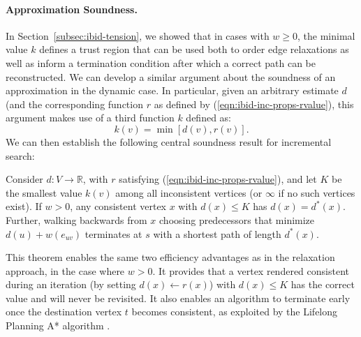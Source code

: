 \paragraph{Approximation Soundness.}
In Section~\ref{subsec:ibid-tension},
we showed that in cases with $w \geq 0$,
the minimal value $k$ defines a trust region that can be used both
to order edge relaxations as well as inform a termination condition
after which a correct path can be reconstructed.
We can develop a similar argument about the soundness of an
approximation in the dynamic case.
In particular,
given an arbitrary estimate $d$
(and the corresponding function $r$ as defined by
(\ref{eqn:ibid-inc-props-rvalue}),
this argument makes use of a third function $k$ defined as:
\begin{equation}
   k(v) = \min\left[ d(v), r(v) \right].
\end{equation}
We can then establish the following central soundness result
for incremental search:

\begin{theorem}
Consider $d: V \rightarrow \mathbb{R}$,
with $r$ satisfying (\ref{eqn:ibid-inc-props-rvalue}),
and let $K$ be the smallest value $k(v)$
among all inconsistent vertices
(or $\infty$ if no such vertices exist).
If $w > 0$,
any consistent vertex $x$ with $d(x) \leq K$
has $d(x) = d^*(x)$.
Further,
walking backwards from $x$ choosing predecessors that minimize
$d(u) + w(e_{uv})$ terminates at $s$ with a shortest path
of length $d^*(x)$.
\label{thm:ibid-dynamicswsffp-sound}
\end{theorem}

This theorem enables the same two efficiency advantages as in
the relaxation approach, in the case where $w > 0$.
It provides that a vertex rendered consistent during an iteration
(by setting $d(x) \leftarrow r(x)$) with $d(x) \leq K$
has the correct value and will never be revisited.
It also enables an algorithm to terminate early
once the destination vertex $t$ becomes consistent,
as exploited by the Lifelong Planning A* algorithm
\citep{koenig2004lpastar}.

